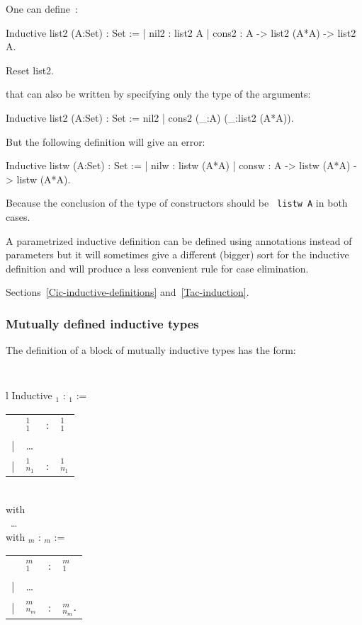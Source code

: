 One can define~:
\begin{coq_example}
Inductive list2 (A:Set) : Set :=
  | nil2 : list2 A
  | cons2 : A -> list2 (A*A) -> list2 A.
\end{coq_example}
\begin{coq_eval}
Reset list2.
\end{coq_eval}
that can also be written by specifying only the type of the arguments:
\begin{coq_example*}
Inductive list2 (A:Set) : Set := nil2 | cons2 (_:A) (_:list2 (A*A)).
\end{coq_example*}
But the following definition will give an error:
\begin{coq_example}
Inductive listw (A:Set) : Set :=
  | nilw : listw (A*A)
  | consw : A -> listw (A*A) -> listw (A*A).
\end{coq_example}
Because the conclusion of the type of constructors should be {\tt
  listw A} in both cases. 

A parametrized inductive definition can be defined using
annotations instead of parameters but it will sometimes give a
different (bigger) sort for the inductive definition and will produce
a less convenient rule for case elimination.

\SeeAlso Sections~\ref{Cic-inductive-definitions} and~\ref{Tac-induction}.


\subsubsection{Mutually defined inductive types
\label{Mutual-Inductive}}

The definition of a block of mutually inductive types has the form:

\medskip
{\tt 
\begin{tabular}{l}
Inductive {\ident$_1$} : {\type$_1$} :=  \\
\begin{tabular}{clcl}
   & {\ident$_1^1$}     &:& {\type$_1^1$} \\
 | & {\ldots} && \\
 | & {\ident$_{n_1}^1$} &:& {\type$_{n_1}^1$}
\end{tabular}  \\
with\\
~{\ldots} \\
with {\ident$_m$} : {\type$_m$} := \\
\begin{tabular}{clcl}
   & {\ident$_1^m$}     &:& {\type$_1^m$} \\
 | & {\ldots} \\
 | & {\ident$_{n_m}^m$} &:& {\type$_{n_m}^m$}.
\end{tabular}
\end{tabular}
}
\medskip

